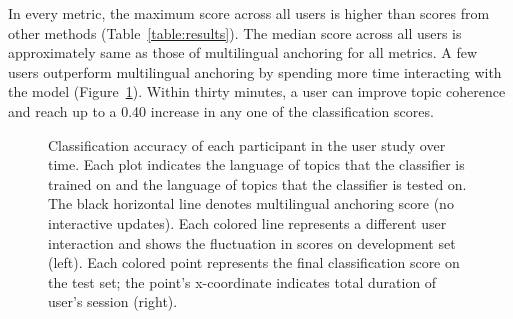 In every metric, the \mtanchor maximum score across all users is higher than scores from other methods (Table~\ref{table:results}).  The \mtanchor median score across all users is approximately same as those of multilingual anchoring for all metrics.  A few users outperform multilingual anchoring by spending more time interacting with the model (Figure~\ref{fig:user}).  Within thirty minutes, a user can improve topic coherence and reach up to a 0.40 increase in any one of the classification scores.  
\begin{figure}
  \centering
  \hfill
  \caption{Classification accuracy of each participant in the \mtanchor user study over time.  Each plot indicates the language of topics that the classifier is trained on and the language of topics that the classifier is tested on.  The black horizontal line denotes multilingual anchoring score (no interactive updates).  Each colored line represents a different user interaction and shows the fluctuation in scores on development set (left).  Each colored point represents the final classification score on the test set; the point's x-coordinate indicates total duration of user's session (right).}
  \label{fig:user}
\end{figure}







